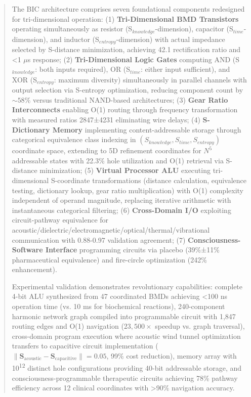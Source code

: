 \documentclass[11pt,a4paper]{article}
\begin{document}
\begin{abstract}
The BIC architecture comprises seven foundational components redesigned for tri-dimensional operation: (1) \textbf{Tri-Dimensional BMD Transistors} operating simultaneously as resistor (S$_{knowledge}$-dimension), capacitor (S$_{time}$-dimension), and inductor (S$_{entropy}$-dimension) with actual impedance selected by S-distance minimization, achieving 42.1 rectification ratio and <1 $\mu$s response; (2) \textbf{Tri-Dimensional Logic Gates}\cite{stellas_circuits} computing AND (S$_{knowledge}$: both inputs required), OR (S$_{time}$: either input sufficient), and XOR (S$_{entropy}$: maximum diversity) simultaneously in parallel channels with output selection via S-entropy optimization, reducing component count by $\sim 58\%$ versus traditional NAND-based architectures; (3) \textbf{Gear Ratio Interconnects} enabling O(1) routing through frequency transformation with measured ratios 2847±4231 eliminating wire delays; (4) \textbf{S-Dictionary Memory}\cite{stellas_dictionary} implementing content-addressable storage through categorical equivalence class indexing in $(S_{knowledge}, S_{time}, S_{entropy})$ coordinate space, extending to 5D refinement coordinates for $N^5$ addressable states with 22.3\% hole utilization and O(1) retrieval via S-distance minimization; (5) \textbf{Virtual Processor ALU}\cite{virtual_processor} executing tri-dimensional S-coordinate transformations (distance calculation, equivalence testing, dictionary lookup, gear ratio multiplication) with O(1) complexity independent of operand magnitude, replacing iterative arithmetic with instantaneous categorical filtering; (6) \textbf{Cross-Domain I/O} exploiting circuit-pathway equivalence for acoustic/dielectric/electromagnetic/optical/thermal/vibrational communication with 0.88-0.97 validation agreement; (7) \textbf{Consciousness-Software Interface} programming circuits via placebo (39\%±11\% pharmaceutical equivalence) and fire-circle optimization (242\% enhancement).

Experimental validation demonstrates revolutionary capabilities: complete 4-bit ALU synthesized from 47 coordinated BMDs achieving <100 ns operation time (vs. 10 ms for biochemical reactions), 240-component harmonic network graph compiled into programmable circuit with 1,847 routing edges and O(1) navigation ($23,500\times$ speedup vs. graph traversal), cross-domain program execution where acoustic wind tunnel optimization transfers to capacitive circuit implementation ($\|\mathbf{S}_{\text{acoustic}} - \mathbf{S}_{\text{capacitive}}\| = 0.05$, 99\% cost reduction), memory array with 10\textsuperscript{12} distinct hole configurations providing 40-bit addressable storage, and consciousness-programmable therapeutic circuits achieving 78\% pathway efficiency across 12 clinical coordinates with >90\% navigation accuracy.


\end{abstract}
\end{document}

